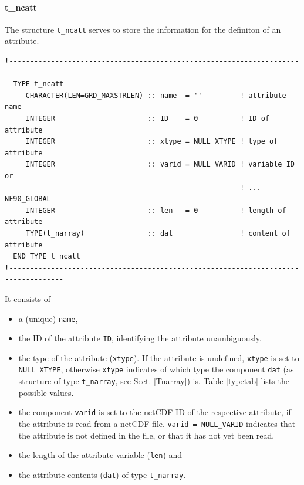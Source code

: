 \documentclass[11pt,twoside]{article}
\begin{document}
\paragraph{{t\_ncatt}\label{Tncatt}\\}
The structure \verb|t_ncatt| serves to store the information for the definiton
of an attribute.
\begin{verbatim}
!-----------------------------------------------------------------------------------
  TYPE t_ncatt
     CHARACTER(LEN=GRD_MAXSTRLEN) :: name  = ''         ! attribute name
     INTEGER                      :: ID    = 0          ! ID of attribute
     INTEGER                      :: xtype = NULL_XTYPE ! type of attribute
     INTEGER                      :: varid = NULL_VARID ! variable ID or
                                                        ! ... NF90_GLOBAL
     INTEGER                      :: len   = 0          ! length of attribute
     TYPE(t_narray)               :: dat                ! content of attribute
  END TYPE t_ncatt
!-----------------------------------------------------------------------------------
\end{verbatim}
It consists of
\begin{itemize}
\item a (unique) \verb|name|,
\item the ID of the attribute \verb|ID|, identifying the attribute
unambiguously. 
\item the type of the attribute (\verb|xtype|). If the attribute is 
undefined, \verb|xtype| is set to \verb|NULL_XTYPE|, otherwise \verb|xtype|
 indicates of which type the component \verb|dat| (as structure
 of type \verb|t_narray|, see Sect. \ref{Tnarray}) is.
 Table \ref{typetab} lists the possible values. 
\item the component \verb|varid| is set to the netCDF ID of the
 respective attribute, if the attribute is read from a netCDF file. 
 \verb|varid = NULL_VARID| indicates that the attribute is not defined
 in the file, or that it has not yet been read.
\item the length of the attribute variable (\verb|len|) and
\item the attribute contents (\verb|dat|) of type \verb|t_narray|.
\end{itemize}
\end{document}
